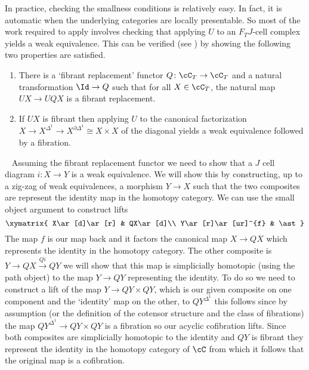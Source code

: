 \documentclass[leqno,oneside,english]{elsarticle}
\newcounter{enumisaved}
\newlength{\thmsaved}
\newlength{\thmnow}
\begin{document}
\begin{remark}\label{rem:model-category-extra-conditions}
  In practice, checking the smallness conditions is relatively easy. In
  fact, it is automatic when the underlying categories are locally
  presentable. So most of the work required to apply
   involves checking that applying $U$ to
  an $F_T J$-cell complex yields a weak equivalence. This can be verified (see \cite[Lem.~B2]{Sch99})
  by showing the following two properties
  are satisfied.
  \begin{enumerate}
    \item  There is a `fibrant replacement' functor $Q\colon
    \cC_T\rightarrow \cC_T$ and a natural transformation $\Id\rightarrow Q$
    such that for all $X\in\cC_T$, the natural map $UX\rightarrow UQX$ is a
    fibrant replacement.
    \item If $UX$ is fibrant then applying $U$ to the canonical
    factorization $ X\rightarrow X^{\Delta^1}\rightarrow X^{\partial
    \Delta^1}\cong X\times X $ of the diagonal yields a weak equivalence
    followed by a fibration.
  \end{enumerate}
  {{
  {}
  \ifshowsaveblocks
  \ 
  {
  Assuming the fibrant replacement functor we need to show that a $J$
  cell diagram $i\colon X\rightarrow Y$ is a weak equivalence. We will show
  this by constructing, up to a zig-zag of weak equivalences, a
  morphism $Y\rightarrow X$ such that the two composites are represent
  the identity map in the homotopy category. We can use the
  small object argument to construct  lifts 
  \[\xymatrix{ 
    X\ar[d]\ar[r] & QX\ar[d]\\ 
    Y\ar[r]\ar[ur]^{f} & \ast
  }\]
  The map $f$ is our map back and it factors the canonical map
  $X\rightarrow QX$ which represents the identity in the homotopy
  category. The other composite is $Y\rightarrow QX\xrightarrow{Qi}
  QY$ we will show that this map is simplicially homotopic (using the
  path object) to the map $Y\rightarrow QY$ representing the identity.
  To do so we need to construct a lift of the map $Y\rightarrow
  QY\times QY$, which is our given composite on one component and the
  `identity' map on the other, to $QY^{\Delta^1}$ this follows since
  by assumption (or the definition of the cotensor structure and the
  class of fibrations) the map $QY^{\Delta^{1}}\rightarrow QY\times QY$  is a
  fibration so our acyclic cofibration lifts. Since both composites
  are simplicially homotopic to the identity and $QY$ is fibrant they
  represent the identity in the homotopy category of $\cC$ from which
  it follows that the original map is a cofibration.
}
  {}
  \ 
  \ifthenelse{\lengthtest{\thmnow > \thmsaved}}{
    
}}}
\end{remark}
\end{document}
